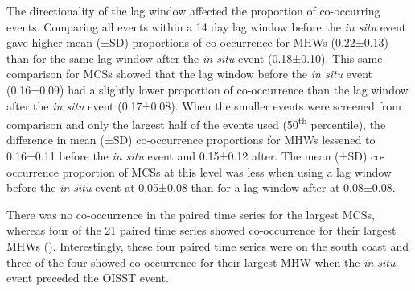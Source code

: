 \documentclass[a4paper,10pt,review]{elsarticle}
\begin{document}
The directionality of the lag window affected the proportion of co-occurring events. Comparing all events within a 14 day lag window before the \emph{in situ} event gave higher mean (±SD) proportions of co-occurrence for MHWs (0.22±0.13) than for the same lag window after the \emph{in situ} event (0.18±0.10). This same comparison for MCSs showed that the lag window before the \emph{in situ} event (0.16±0.09) had a slightly lower proportion of co-occurrence than the lag window after the \emph{in situ} event (0.17±0.08). When the smaller events were screened from comparison and only the largest half of the events used (50\textsuperscript{th} percentile), the difference in mean (±SD) co-occurrence proportions for MHWs lessened to 0.16±0.11 before the \emph{in situ} event and 0.15±0.12 after. The mean (±SD) co-occurrence proportion of MCSs at this level was less when using a lag window before the \emph{in situ} event at 0.05±0.08 than for a lag window after at 0.08±0.08.

There was no co-occurrence in the paired time series for the largest MCSs, whereas four of the 21 paired time series showed co-occurrence for their largest MHWs (). Interestingly, these four paired time series were on the south coast and three of the four showed co-occurrence for their largest MHW when the \emph{in situ} event preceded the OISST event.
\end{document}
